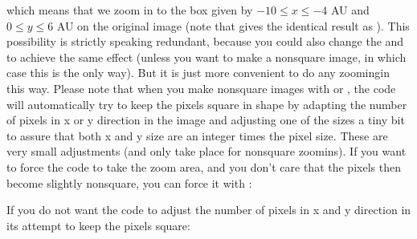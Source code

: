 \documentclass[letterpaper,10pt,english]{sphinxmanual}
\begin{document}
which means that we zoom in to the box given by \(-10\le x\le-4\) AU and
\(0\le y\le 6\) AU on the original image (note that 
gives the identical result as ). This possibility is strictly
speaking redundant, because you could also change the  and 
to achieve the same effect (unless you want to make a non\sphinxhyphen{}square image, in which
case this is the only way). But it is just more convenient to do any zooming\sphinxhyphen{}in
this way. Please note that when you make non\sphinxhyphen{}square images with  or
, the code will automatically try to keep the pixels square in shape
by adapting the number of pixels in x\sphinxhyphen{} or y\sphinxhyphen{} direction in the image and
adjusting one of the sizes a tiny bit to assure that both x\sphinxhyphen{} and y\sphinxhyphen{} size are an
integer times the pixel size. These are very small adjustments (and only take
place for non\sphinxhyphen{}square zoom\sphinxhyphen{}ins).  If you want to force the code to take 
the zoom area, and you don’t care that the pixels then become slightly
non\sphinxhyphen{}square, you can force it with :

\begin{sphinxVerbatim}[commandchars=\\\{\}]
               
\end{sphinxVerbatim}

If you do not want the code to adjust the number of pixels in x\sphinxhyphen{} and y\sphinxhyphen{}
direction in its attempt to keep the pixels square:

\begin{sphinxVerbatim}[commandchars=\\\{\}]
                   
\end{sphinxVerbatim}
\end{document}

